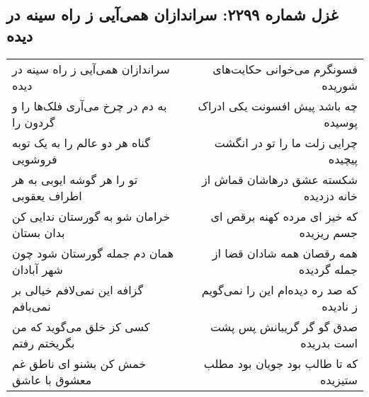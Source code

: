 \begin{center}
\section*{غزل شماره ۲۲۹۹: سراندازان همی‌آیی ز راه سینه در دیده}
\label{sec:2299}
\begin{longtable}{l p{0.5cm} r}
سراندازان همی‌آیی ز راه سینه در دیده
&&
فسونگرم می‌خوانی حکایت‌های شوریده
\\
به دم در چرخ می‌آری فلک‌ها را و گردون را
&&
چه باشد پیش افسونت یکی ادراک پوسیده
\\
گناه هر دو عالم را به یک توبه فروشویی
&&
چرایی زلت ما را تو در انگشت پیچیده
\\
تو را هر گوشه ایوبی به هر اطراف یعقوبی
&&
شکسته عشق درهاشان قماش از خانه دزدیده
\\
خرامان شو به گورستان ندایی کن بدان بستان
&&
که خیز ای مرده کهنه برقص ای جسم ریزیده
\\
همان دم جمله گورستان شود چون شهر آبادان
&&
همه رقصان همه شادان قضا از جمله گردیده
\\
گزافه این نمی‌لافم خیالی بر نمی‌بافم
&&
که صد ره دیده‌ام این را نمی‌گویم ز نادیده
\\
کسی کز خلق می‌گوید که من بگریختم رفتم
&&
صدق گو گر گریبانش پس پشت است بدریده
\\
خمش کن بشنو ای ناطق غم معشوق با عاشق
&&
که تا طالب بود جویان بود مطلب ستیزیده
\\
\end{longtable}
\end{center}
